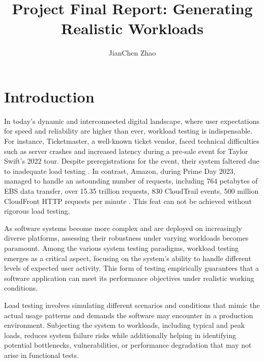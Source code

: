 

\title{Project Final Report: Generating Realistic Workloads}
\author{JianChen Zhao}




\begin{abstract}
\end{abstract}

\maketitle

\section{Introduction}

In today's dynamic and interconnected digital landscape, where user expectations for speed and reliability are higher than ever, workload testing is indispensable. For instance, Ticketmaster, a well-known ticket vendor, faced technical difficulties such as server crashes and increased latency during a pre-sale event for Taylor Swift's 2022 tour. Despite preregistrations for the event, their system faltered due to inadequate load testing \cite{Reuters2022-dc}. In contrast, Amazon, during Prime Day 2023, managed to handle an astounding number of requests, including 764 petabytes of EBS data transfer, over 15.35 trillion requests, 830 CloudTrail events, 500 million CloudFront HTTP requests per minute \cite{Barr2023-wr}. This feat can not be achieved without rigorous load testing.

As software systems become more complex and are deployed on increasingly diverse platforms, assessing their robustness under varying workloads becomes paramount. Among the various system testing paradigms, workload testing emerges as a critical aspect, focusing on the system's ability to handle different levels of expected user activity. This form of testing empirically guarantees that a software application can meet its performance objectives under realistic working conditions.

Load testing involves simulating different scenarios and conditions that mimic the actual usage patterns and demands the software may encounter in a production environment. Subjecting the system to workloads, including typical and peak loads, reduces system failure risks while additionally helping in identifying potential bottlenecks, vulnerabilities, or performance degradation that may not arise in functional tests.

